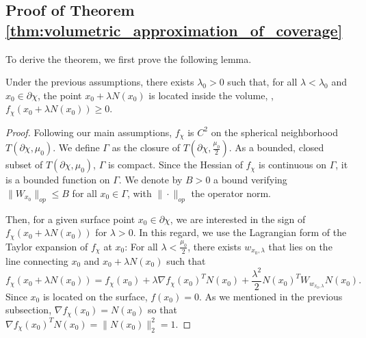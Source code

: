 \subsection{Proof of Theorem \ref{thm:volumetric_approximation_of_coverage}}

To derive the theorem, we first prove the following lemma.

\begin{lemma}
\label{thm:lemma}
Under the previous assumptions, there exists $\lambda_0>0$ such that, for all $\lambda<\lambda_0$ and $x_0\in \partial\chi$, the point $x_0 + \lambda N(x_0)$ is located inside the volume, \ie, $f_\chi(x_0+\lambda N(x_0)) \geq 0$.
\end{lemma}

\begin{proof}
Following our main assumptions, $f_\chi$ is $C^2$ on the spherical neighborhood $T(\partial\chi, \mu_0)$. We define $\Gamma$ as the closure of $T(\partial\chi, \frac{\mu_0}{2})$. As a bounded, closed subset of $T(\partial\chi, \mu_0)$, $\Gamma$ is compact. Since the Hessian of $f_\chi$ is continuous on $\Gamma$, it is a bounded function on $\Gamma$. We denote by $B>0$ a bound verifying $\|W_{x_0}\|_{op} \leq B$ for all $x_0 \in \Gamma$, with $\|\cdot\|_{op}$ the operator norm.

Then, for a given surface point $x_0 \in \partial\chi$, we are interested in the sign of $f_\chi(x_0 + \lambda N(x_0))$ for $\lambda>0$. In this regard, we use the Lagrangian form of the Taylor expansion of $f_\chi$ at $x_0$: For all $\lambda < \frac{\mu_0}{2}$, there exists $w_{x_0, \lambda}$ that lies on the line connecting $x_0$ and $x_0 + \lambda N(x_0)$ such that
%
\begin{equation}
    f_\chi(x_0 + \lambda N(x_0)) = f_\chi(x_0) + \lambda \nabla f_\chi(x_0)^T N(x_0) + \frac{\lambda^2}{2} N(x_0)^T W_{w_{x_0, \lambda}} N(x_0).
\end{equation}
%
Since $x_0$ is located on the surface, $f(x_0)=0$. As we mentioned in the previous subsection, $\nabla f_\chi(x_0) = N(x_0)$ so that $\nabla f_\chi(x_0)^T N(x_0) = \|N(x_0)\|_2^2 = 1$. 


\end{proof}
